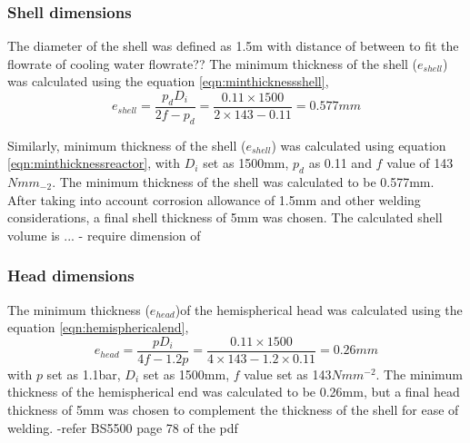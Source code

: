 \subsubsection{Shell dimensions}
The diameter of the shell was defined as 1.5m with distance of between to fit the flowrate of cooling water flowrate??
The minimum thickness of the shell ($e_{shell}$) was calculated using the equation \ref{eqn:minthicknessshell},
\begin{equation}
    e_{shell} = \frac{p_dD_i}{2f-p_d} = \frac{0.11 \times 1500}{2 \times 143 - 0.11} = 0.577mm
    \label{eqn:minthicknessshell}
\end{equation}

Similarly, minimum thickness of the shell ($e_{shell}$) was calculated using equation \ref{eqn:minthicknessreactor}, with $D_i$ set as 1500mm, $p_d$ as 0.11 and $f$ value of 143$Nmm_{-2}$. The minimum thickness of the shell was calculated to be 0.577mm. After taking into account corrosion allowance of 1.5mm and other welding considerations, a final shell thickness of 5mm was chosen. 
The calculated shell volume is ...
- require dimension of 
\subsubsection{Head dimensions}
The minimum thickness ($e_{head}$)of the hemispherical head was calculated using the equation \ref{eqn:hemisphericalend},
\begin{equation}
    e_{head} = \frac{pD_i}{4f-1.2p} = \frac{0.11 \times 1500}{4 \times 143 - 1.2 \times 0.11} = 0.26mm
    \label{eqn:hemisphericalend}
\end{equation}
with $p$ set as 1.1bar, $D_i$ set as 1500mm, $f$ value set as 143$Nmm^{-2}$.  The minimum thickness of the hemispherical end was calculated to be 0.26mm, but a final head thickness of 5mm was chosen to complement the thickness of the shell for ease of welding. 
-refer BS5500 page 78 of the pdf

